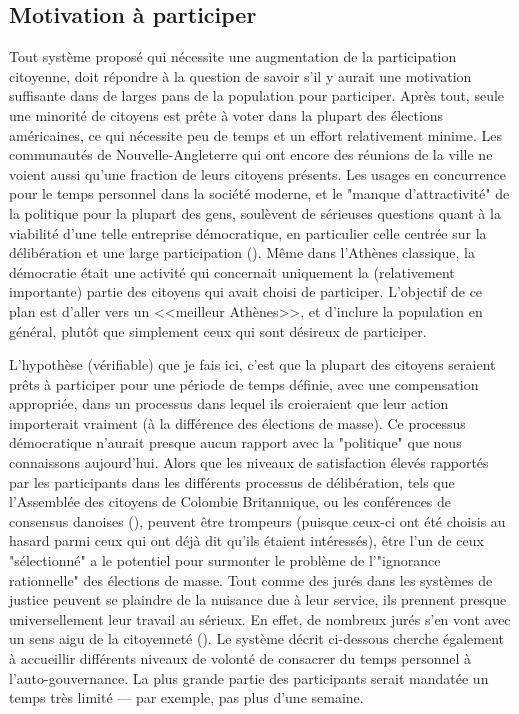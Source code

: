 \subsection{Motivation à participer}
Tout système proposé qui nécessite une augmentation de la
participation citoyenne, doit répondre à la 
question de savoir s'il y aurait une motivation suffisante dans de
larges pans de la population pour participer. Après tout, seule une
minorité de citoyens est prête à voter dans la plupart des élections
américaines, ce qui nécessite peu de temps et un effort relativement
minime. Les communautés de Nouvelle-Angleterre qui ont encore des
réunions de la ville ne voient aussi qu'une fraction de leurs citoyens
présents. Les usages en concurrence pour le temps personnel dans la
société moderne, et le "manque d'attractivité" de la politique pour la
plupart des gens, soulèvent de sérieuses questions quant à la
viabilité d'une telle entreprise démocratique, en particulier celle
centrée sur la délibération et une large participation
(\autocite{warren96}). Même dans l'Athènes classique, la démocratie était
une activité qui concernait uniquement la (relativement importante) partie des
citoyens qui avait choisi de participer. L'objectif de ce plan est
d'aller vers un <<meilleur Athènes>>, et d'inclure la population en
général, plutôt que simplement ceux qui sont désireux de participer.\par
L'hypothèse (vérifiable) que je fais ici, c'est que la plupart des
citoyens seraient prêts à participer pour une période de temps
définie, avec une compensation appropriée, dans un processus dans
lequel ils croieraient que leur action importerait vraiment (à la
différence des élections de masse). Ce processus démocratique n'aurait
presque aucun rapport avec la "politique" que nous connaissons
aujourd'hui. Alors que les niveaux de satisfaction élevés 
rapportés par les participants dans les différents processus de
délibération, tels que l'Assemblée des citoyens de Colombie
Britannique, ou les conférences de consensus danoises (\autocite{fischer09}),
peuvent être trompeurs (puisque ceux-ci ont été choisis au hasard parmi
ceux qui ont déjà dit qu'ils étaient intéressés), être l'un de ceux
"sélectionné" a le potentiel pour surmonter le problème de
l'"ignorance rationnelle" des élections de masse. Tout comme des jurés
dans les systèmes de justice peuvent se plaindre de la nuisance due à leur
service, ils prennent presque universellement leur travail au
sérieux. En effet, de nombreux jurés s'en vont avec un sens aigu de la
citoyenneté (\autocite{matthews04}). Le système décrit ci-dessous cherche
également à accueillir différents niveaux de volonté de consacrer du
temps personnel à l'auto-gouvernance. La plus grande partie des
participants serait mandatée un temps très limité --- par exemple, pas
plus d'une semaine.\par
